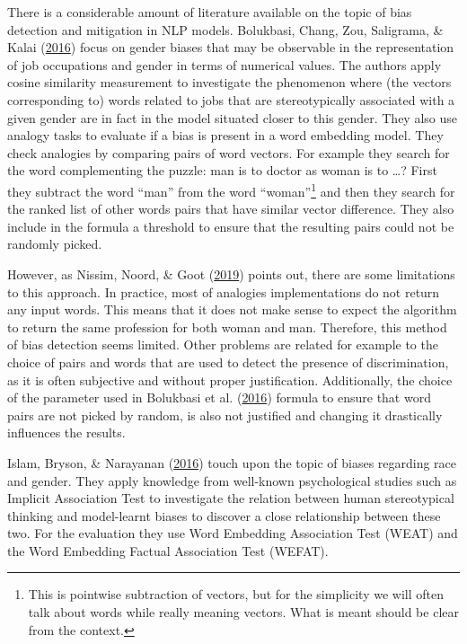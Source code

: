 \documentclass[12pt,]{book}
\begin{document}
There is a considerable amount of literature available on the topic of
bias detection and mitigation in NLP models. Bolukbasi, Chang, Zou,
Saligrama, \& Kalai (\protect\hyperlink{ref-Bolukbasi2016Man}{2016})
focus on gender biases that may be observable in the representation of
job occupations and gender in terms of numerical values. The authors
apply cosine similarity measurement to investigate the phenomenon where
(the vectors corresponding to) words related to jobs that are
stereotypically associated with a given gender are in fact in the model
situated closer to this gender. They also use analogy tasks to evaluate
if a bias is present in a word embedding model. They check analogies by
comparing pairs of word vectors. For example they search for the word
complementing the puzzle: man is to doctor as woman is to \ldots{}?
First they subtract the word ``man'' from the word ``woman''\footnote{This
  is pointwise subtraction of vectors, but for the simplicity we will
  often talk about words while really meaning vectors. What is meant
  should be clear from the context.} and then they search for the ranked
list of other words pairs that have similar vector difference. They also
include in the formula a threshold to ensure that the resulting pairs
could not be randomly picked.

However, as Nissim, Noord, \& Goot
(\protect\hyperlink{ref-Nissim2019Fair}{2019}) points out, there are
some limitations to this approach. In practice, most of analogies
implementations do not return any input words. This means that it does
not make sense to expect the algorithm to return the same profession for
both woman and man. Therefore, this method of bias detection seems
limited. Other problems are related for example to the choice of pairs
and words that are used to detect the presence of discrimination, as it
is often subjective and without proper justification. Additionally, the
choice of the parameter used in Bolukbasi et al.
(\protect\hyperlink{ref-Bolukbasi2016Man}{2016}) formula to ensure that
word pairs are not picked by random, is also not justified and changing
it drastically influences the results.

Islam, Bryson, \& Narayanan
(\protect\hyperlink{ref-Caliskan2017Semantics}{2016}) touch upon the
topic of biases regarding race and gender. They apply knowledge from
well-known psychological studies such as Implicit Association Test to
investigate the relation between human stereotypical thinking and
model-learnt biases to discover a close relationship between these two.
For the evaluation they use Word Embedding Association Test (WEAT) and
the Word Embedding Factual Association Test (WEFAT).
\end{document}
